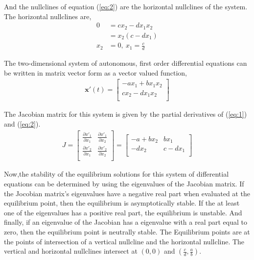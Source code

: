 \documentclass[12pt]{article}   %
\theoremstyle{definition}
\numberwithin{equation}{section}
\begin{document}
\quad And the nullclines of equation (\ref{eq:2}) are the horizontal nullclines of the system. The horizontal nullclines are, 
\begin{align*}
  0 & = cx_2 - dx_1x_2 \\  
  & =  x_2(c - dx_1) \\
  x_2 &= 0, \ x_1 = \frac{c}{d} 
\end{align*}

\quad The two-dimensional system of autonomous, first order differential equations can be written in matrix vector form as a vector valued function, 
\begin{align*} 
  \textbf{x}'(t) 
  = 
  \begin{bmatrix}
    -ax_1 + bx_1x_2\\
    cx_2 - dx_1x_2\\
  \end{bmatrix}
\end{align*}

\quad The Jacobian matrix for this system is given by the partial derivatives of (\ref{eq:1}) and (\ref{eq:2}).
\begin{align*} 
  J 
  =
  \begin{bmatrix}
    \frac{\partial{x'_1}}{\partial{x_1}} & \frac{\partial{x'_1}}{\partial{x_2}}\\
    \frac{\partial{x'_2}}{\partial{x_1}} &  \frac{\partial{x'_2}}{\partial{x_2}}\\
  \end{bmatrix}
  =
  \begin{bmatrix}
    -a+bx_2 & bx_1\\
    -dx_2 & c-dx_1\\
  \end{bmatrix}
\end{align*}

\quad Now,the stability of the equilibrium solutions for this system of differential equations can be determined by using the eigenvalues of the Jacobian matrix. If the Jocobian matrix's eigenvalues have a negative real part when evaluated at the equilibrium point, then the equilibrium is asymptotically stable. If the at least one of the eigenvalues has a positive real part, the equilibrium is unstable. And finally, if an eigenvalue of the Jacobian has a eigenvalue with a real part equal to zero, then the equilibrium point is neutrally stable. The Equilibrium points are at the points of intersection of a vertical nullcline and the horizontal nullcline. The vertical and horizontal nullclines intersect at $(0,0)$ and $(\frac{c}{d},\frac{a}{b})$.  
\end{document}
